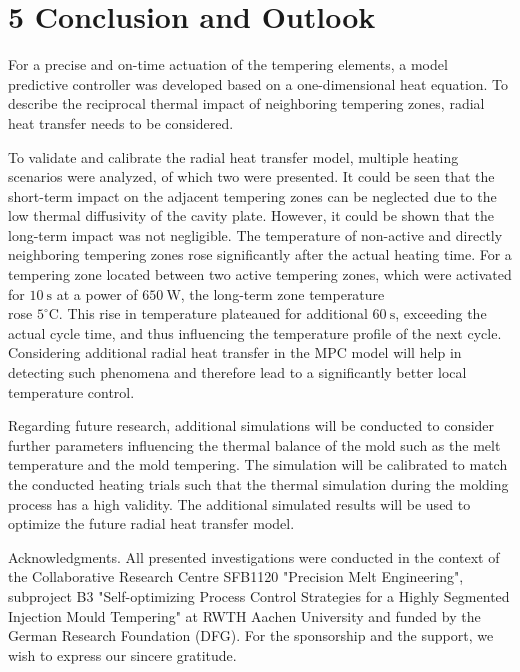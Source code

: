 \documentclass[10pt]{article}
\begin{document}
\section*{5 Conclusion and Outlook}
For a precise and on-time actuation of the tempering elements, a model predictive controller was developed based on a one-dimensional heat equation. To describe the reciprocal thermal impact of neighboring tempering zones, radial heat transfer needs to be considered.

To validate and calibrate the radial heat transfer model, multiple heating scenarios were analyzed, of which two were presented. It could be seen that the short-term impact on the adjacent tempering zones can be neglected due to the low thermal diffusivity of the cavity plate. However, it could be shown that the long-term impact was not negligible. The temperature of non-active and directly neighboring tempering zones rose significantly after the actual heating time. For a tempering zone located between two active tempering zones, which were activated for $10 \mathrm{~s}$ at a power of $650 \mathrm{~W}$, the long-term zone temperature\\
rose $5^{\circ} \mathrm{C}$. This rise in temperature plateaued for additional $60 \mathrm{~s}$, exceeding the actual cycle time, and thus influencing the temperature profile of the next cycle. Considering additional radial heat transfer in the MPC model will help in detecting such phenomena and therefore lead to a significantly better local temperature control.

Regarding future research, additional simulations will be conducted to consider further parameters influencing the thermal balance of the mold such as the melt temperature and the mold tempering. The simulation will be calibrated to match the conducted heating trials such that the thermal simulation during the molding process has a high validity. The additional simulated results will be used to optimize the future radial heat transfer model.

Acknowledgments. All presented investigations were conducted in the context of the Collaborative Research Centre SFB1120 "Precision Melt Engineering", subproject B3 "Self-optimizing Process Control Strategies for a Highly Segmented Injection Mould Tempering" at RWTH Aachen University and funded by the German Research Foundation (DFG). For the sponsorship and the support, we wish to express our sincere gratitude.
\end{document}
